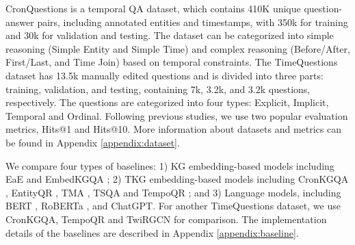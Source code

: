 \documentclass[11pt]{article}
\begin{document}
CronQuestions \cite{cronqa} is a temporal QA dataset, which contains 410K unique question-answer pairs, including annotated entities and timestamps, with 350k for training and 30k for validation and testing. The dataset can be categorized into simple reasoning (Simple Entity and Simple Time) and complex reasoning (Before/After, First/Last, and Time Join) based on temporal constraints. 
The TimeQuestions dataset \cite{TwiRGCN}  has 13.5k manually edited questions and is divided into three parts: training, validation, and testing, containing 7k, 3.2k, and 3.2k questions, respectively.
The questions are categorized into four types: Explicit, Implicit, Temporal and Ordinal.
Following previous studies, we use two popular evaluation metrics, Hits@1 and Hits@10.
More information about datasets and metrics can be found in Appendix \ref{appendix:dataset}.

We compare four types of baselines: 1) KG embedding-based models including EaE \cite{EaE} and EmbedKGQA \cite{EmbeddedKGQA}; 2) TKG embedding-based models including CronKGQA \cite{cronqa}, EntityQR \cite{tempoqa}, TMA \cite{TMA}, TSQA \cite{TSQA} and TempoQR \cite{tempoqa}; and 3) Language models, including BERT \cite{BERT}, RoBERTa \cite{roberta}, and ChatGPT. 
For another TimeQuestions dataset, we use CronKGQA, TempoQR and TwiRGCN \cite{TwiRGCN} for comparison.
The implementation details of the baselines are described in Appendix \ref{appendix:baseline}.




\begin{table}
\centering
{}
    \caption{Hits@1 for different models on TimeQuestions.}
\label{tab:mainresult2}
\end{table}
\end{document}
